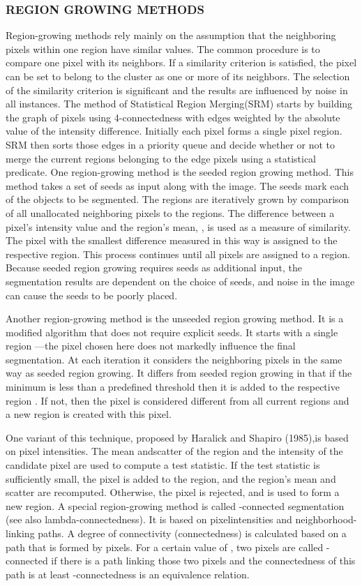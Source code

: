 \subsubsection{REGION GROWING METHODS}
Region-growing methods rely mainly on the assumption that the neighboring pixels within one region have similar values. The common procedure is to compare one pixel with its neighbors. If a similarity criterion is satisfied, the pixel can be set to belong to the cluster as one or more of its neighbors. The selection of the similarity criterion is significant and the results are influenced by noise in all instances.
The method of Statistical Region Merging(SRM) starts by building the graph of pixels using 4-connectedness with edges weighted by the absolute value of the intensity difference. Initially each pixel forms a single pixel region. SRM then sorts those edges in a priority queue and decide whether or not to merge the current regions belonging to the edge pixels using a statistical predicate.
One region-growing method is the seeded region growing method. This method takes a set of seeds as input along with the image. The seeds mark each of the objects to be segmented. The regions are iteratively grown by comparison of all unallocated neighboring pixels to the regions. The difference between a pixel's intensity value and the region's mean, , is used as a measure of similarity. The pixel with the smallest difference measured in this way is assigned to the respective region. This process continues until all pixels are assigned to a region. Because seeded region growing requires seeds as additional input, the segmentation results are dependent on the choice of seeds, and noise in the image can cause the seeds to be poorly placed.

Another region-growing method is the unseeded region growing method. It is a modified algorithm that does not require explicit seeds. It starts with a single region —the pixel chosen here does not markedly influence the final segmentation. At each iteration it considers the neighboring pixels in the same way as seeded region growing. It differs from seeded region growing in that if the minimum is less than a predefined threshold then it is added to the respective region . If not, then the pixel is considered different from all current regions and a new region is created with this pixel.

One variant of this technique, proposed by Haralick and Shapiro (1985),is  based on pixel intensities. The mean andscatter of the region and the intensity of the candidate pixel are used to compute a test statistic. If the test statistic is sufficiently small, the pixel is added to the region, and the region’s mean and scatter are recomputed. Otherwise, the pixel is rejected, and is used to form a new region.
A special region-growing method is called -connected segmentation (see also lambda-connectedness). It is based on pixelintensities and neighborhood-linking paths. A degree of connectivity (connectedness) is calculated based on a path that is formed by pixels. For a certain value of , two pixels are called -connected if there is a path linking those two pixels and the connectedness of this path is at least -connectedness is an equivalence relation.

